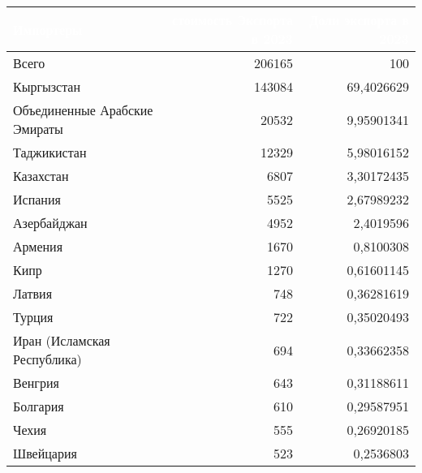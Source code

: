 \footnotesize{
\begin{tabularx}{\textwidth}{|X|r|r|}
    \hline
\rowcolor{black} \textcolor{white}{\textbf{Импортеры}} & \textcolor{white}{\textbf{стоимость Экспорта в 2023}} & \textcolor{white}{\textbf{Доли экспорта в 2023}} \\ \hline
Всего & 206165 & 100 \\ \hline
Кыргызстан & 143084 & 69,4026629 \\ \hline
Объединенные Арабские Эмираты & 20532 & 9,95901341 \\ \hline
Таджикистан & 12329 & 5,98016152 \\ \hline
Казахстан & 6807 & 3,30172435 \\ \hline
Испания & 5525 & 2,67989232 \\ \hline
Азербайджан & 4952 & 2,4019596 \\ \hline
Армения & 1670 & 0,8100308 \\ \hline
Кипр & 1270 & 0,61601145 \\ \hline
Латвия & 748 & 0,36281619 \\ \hline
Турция & 722 & 0,35020493 \\ \hline
Иран (Исламская Республика) & 694 & 0,33662358 \\ \hline
Венгрия & 643 & 0,31188611 \\ \hline
Болгария & 610 & 0,29587951 \\ \hline
Чехия & 555 & 0,26920185 \\ \hline
Швейцария & 523 & 0,2536803 \\ \hline
\end{tabularx}
}